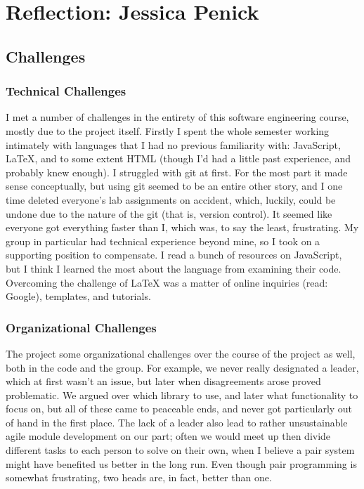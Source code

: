 \documentclass[a4paper]{article}
\begin{document}
\section{Reflection: Jessica Penick}
\subsection{Challenges}
\subsubsection{Technical Challenges}
I met a number of challenges in the entirety of this software engineering course, mostly due to the project itself. Firstly I spent the whole semester working intimately with languages that I had no previous familiarity with: JavaScript, LaTeX, and to some extent HTML (though I'd had a little past experience, and probably knew enough). I struggled with git at first. For the most part it made sense conceptually, but using git seemed to be an entire other story, and I one time deleted everyone's lab assignments on accident, which, luckily, could be undone due to the nature of the git (that is, version control). It seemed like everyone got everything faster than I, which was, to say the least, frustrating. My group in particular had technical experience beyond mine, so I took on a supporting position to compensate. I read a bunch of resources on JavaScript, but I think I learned the most about the language from examining their code. Overcoming the challenge of LaTeX was a matter of online inquiries (read: Google), templates, and tutorials.

\subsubsection{Organizational Challenges}
The project some organizational challenges over the course of the project as well, both in the code and the group. For example, we never really designated a leader, which at first wasn't an issue, but later when disagreements arose proved problematic. We argued over which library to use, and later what functionality to focus on, but all of these came to peaceable ends, and never got particularly out of hand in the first place. The lack of a leader also lead to rather unsustainable agile module development on our part; often we would meet up then divide different tasks to each person to solve on their own, when I believe a pair system might have benefited us better in the long run. Even though pair programming is somewhat frustrating, two heads are, in fact, better than one. 
\end{document}
